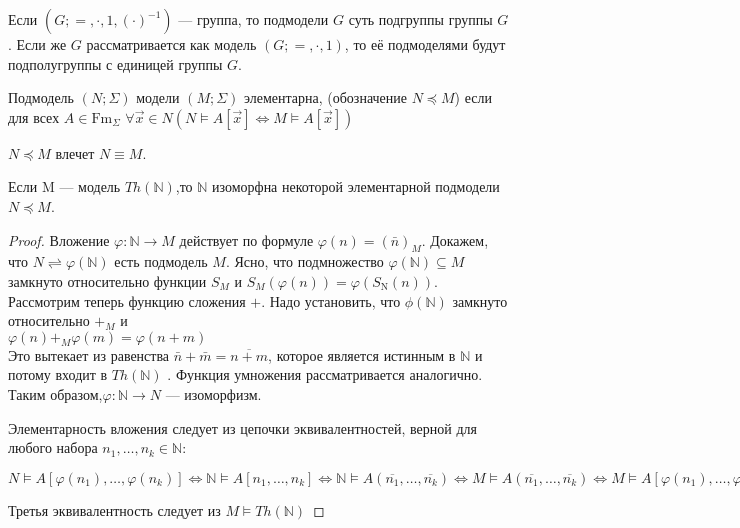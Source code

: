 \begin{example}
	Если $\left(G ;=, \cdot, 1,(\cdot)^{-1}\right)$ — группа, то  подмодели $G$ суть подгруппы группы $G$. Если же
	$G$  рассматривается как модель $(G ;=, \cdot, 1)$, то её подмоделями будут подполугруппы с единицей группы
	$G$.
\end{example}
\begin{definition}
	Подмодель $(N ;\Sigma)$ модели $(M ;\Sigma)$ элементарна, (обозначение $N \preccurlyeq M$) если для всех $A \in
	\mathrm{Fm}_{\Sigma}$ $\forall \vec{x} \in N(N \vDash A[\vec{x}] \Longleftrightarrow M \vDash A[\vec{x}])$
\end{definition}
\begin{proposition}
	$N \preccurlyeq M$ влечет $N \equiv M$.
\end{proposition}
\begin{example}
	Если M — модель $Th(\mathbb{N})$,то $\mathbb{N}$ изоморфна некоторой элементарной подмодели  $N \preccurlyeq M$.
\end{example}
\begin{proof}
	Вложение $\varphi: \mathbb{N} \rightarrow M$ действует по формуле $\varphi(n)=(\bar{n})_{M}$.
	Докажем, что $N \rightleftharpoons \varphi(\mathbb{N})$
	есть подмодель $M$. Ясно, что подмножество $\varphi(\mathbb{N}) \subseteq M$ замкнуто относительно функции $S_M$ и
	$S_{M}(\varphi(n))=\varphi\left(S_{\mathrm{N}}(n)\right)$. Рассмотрим теперь функцию сложения $+$. Надо
	установить, что $\phi(\mathbb{N})$ замкнуто относительно $+_M$ и 
	\\$\varphi(n)+_{M} \varphi(m)=\varphi(n+m)$\\
	Это вытекает из равенства $\bar{n}+\bar{m}=\overline{n+m}$, которое является истинным в $\mathbb{N}$
	и потому входит в $Th(\mathbb{N})$ . Функция умножения рассматривается аналогично.
	Таким образом,$\varphi\colon\mathbb{N}\to N$  — изоморфизм.

	Элементарность вложения следует из цепочки эквивалентностей, верной для любого набора $n_{1},\ldots,n_{k} \in
	\mathbb{N}$:

	$N\vDash A\left[\varphi\left(n_1\right),\ldots,\varphi\left(n_k\right)\right]\Leftrightarrow
	\mathbb{N}\vDash A\left[n_1,\ldots,n_k\right] \Leftrightarrow\mathbb{N}\vDash A(\overline{n_1},
	\ldots,\overline{n_k})\Leftrightarrow M\vDash A(\overline{n_1},\ldots,\overline{n_{k}})
	\Leftrightarrow M \vDash A\left[\varphi\left(n_{1}\right), \ldots, \varphi\left(n_{k}\right)\right]$

	Третья эквивалентность следует из $M \vDash T h(\mathbb{N})$
\end{proof}
